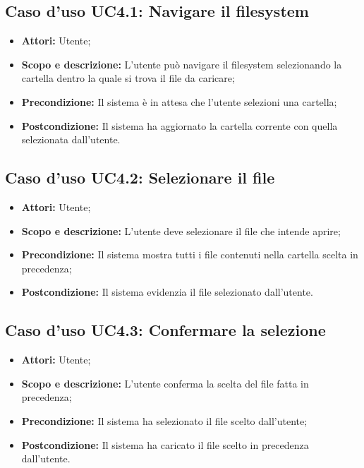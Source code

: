 \subsection{Caso d'uso UC4.1: Navigare il filesystem}
\begin{itemize}
	\item \textbf{Attori:} Utente;
	\item \textbf{Scopo e descrizione:} L'utente può navigare il filesystem selezionando la cartella dentro la quale si trova il file da caricare;
	\item \textbf{Precondizione:} Il sistema è in attesa che l'utente selezioni una cartella;
	\item \textbf{Postcondizione:} Il sistema ha aggiornato la cartella corrente con quella selezionata dall'utente.
\end{itemize}

\subsection{Caso d'uso UC4.2: Selezionare il file}
\begin{itemize}
	\item \textbf{Attori:} Utente;
	\item \textbf{Scopo e descrizione:} L'utente deve selezionare il file che intende aprire;
	\item \textbf{Precondizione:} Il sistema mostra tutti i file contenuti nella cartella scelta in precedenza;
	\item \textbf{Postcondizione:} Il sistema evidenzia il file selezionato dall'utente.
\end{itemize}

\subsection{Caso d'uso UC4.3: Confermare la selezione}
\begin{itemize}
	\item \textbf{Attori:} Utente;
	\item \textbf{Scopo e descrizione:} L'utente conferma la scelta del file fatta in precedenza;
	\item \textbf{Precondizione:} Il sistema ha selezionato il file scelto dall'utente;
	\item \textbf{Postcondizione:} Il sistema ha caricato il file scelto in precedenza dall'utente.
\end{itemize}